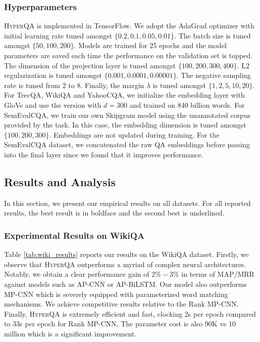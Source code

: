 \documentclass[sigconf]{acmart}
\begin{document}
\subsubsection{Hyperparameters}
\textsc{HyperQA} is implemented in TensorFlow. We adopt the AdaGrad \cite{DBLP:journals/jmlr/DuchiHS11} optimizer with initial learning rate tuned amongst $\{0.2,0.1,0.05,0.01\}$. The batch size is tuned amongst $\{50,100,200\}$. Models are trained for $25$ epochs and the model parameters are saved each time the performance on the validation set is topped. The dimension of the projection layer is tuned amongst $\{100,200,300,400\}$. L2 regularization is tuned amongst $\{0.001, 0.0001, 0.00001\}$. The negative sampling rate is tuned from $2$ to $8$. Finally, the margin $\lambda$ is tuned amongst $\{1,2, 5,10,20\}$. For TrecQA, WikiQA and YahooCQA, we initialize the embedding layer with GloVe \cite{DBLP:conf/emnlp/PenningtonSM14} and use the version with $d=300$ and trained on 840 billion words. For SemEvalCQA, we train our own Skipgram model using the unannotated corpus provided by the task.  In this case, the embedding dimension is tuned amongst $\{100,200,300\}$. Embeddings are not updated during training. For the SemEvalCQA dataset, we concatenated the raw QA embeddings before passing into the final layer since we found that it improves performance.

\subsection{Results and Analysis}
In this section, we present our empirical results on all datasets. For all reported results, the best result is in boldface and the second best is underlined. 


\subsubsection{Experimental Results on WikiQA}
Table \ref{tab:wiki_results} reports our results on the WikiQA dataset. Firstly, we observe that \textsc{HyperQA} outperforms a myriad
of complex neural architectures. Notably, we obtain a clear performance gain of $2\%-3\%$ in terms of MAP/MRR against models such as AP-CNN or
AP-BiLSTM. Our model also outperforms MP-CNN which is severely equipped with parameterized word matching mechanisms.  We achieve competitive results
relative to the Rank MP-CNN. Finally, \textsc{HyperQA} is extremely efficient and fast, clocking 2s per epoch compared to 33s per epoch for Rank MP-CNN. The parameter cost
is also 90K vs 10 million which is a significant improvement. 
\end{document}
